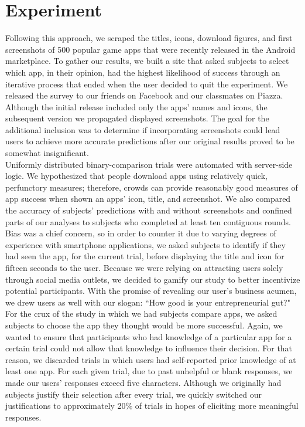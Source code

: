 \section{Experiment}


Following this approach, we scraped the titles, icons, download figures, and first screenshots of 500 popular game apps that were recently released in the Android marketplace.  To gather our results, we built a site that asked subjects to select which app, in their opinion, had the highest likelihood of success through an iterative process that ended when the user decided to quit the experiment.  We released the survey to our friends on Facebook and our classmates on Piazza. Although the initial release included only the apps' names and icons, the subsequent version we propagated displayed screenshots. The goal for the additional inclusion was to determine if incorporating screenshots could lead users to achieve more accurate predictions after our original results proved to be somewhat insignificant.  \\

Uniformly distributed binary-comparison trials were automated with server-side logic. We hypothesized that people download apps using relatively quick, perfunctory measures; therefore, crowds can provide reasonably good measures of app success when shown an apps' icon, title, and screenshot. We also compared the accuracy of subjects' predictions with and without screenshots and confined parts of our analyses to subjects who completed at least ten contiguous rounds. Bias was a chief concern, so in order to counter it due to varying degrees of experience with smartphone applications, we asked subjects to identify if they had seen the app, for the current trial, before displaying the title and icon for fifteen seconds to the user. Because we were relying on attracting users solely through social media outlets, we decided to gamify our study to better incentivize potential participants. With the promise of revealing our user's business acumen, we drew users as well with our slogan: “How good is your entrepreneurial gut?"\\

For the crux of the study in which we had subjects compare apps, we asked subjects to choose the app they thought would be more successful.  Again, we wanted to ensure that participants who had knowledge of a particular app for a certain trial could not allow that knowledge to influence their decision. For that reason, we discarded trials in which users had self-reported prior knowledge of at least one app. For each given trial, due to past unhelpful or blank responses, we made our users' responses exceed five characters. Although we originally had subjects justify their selection after every trial, we quickly switched our justifications to approximately 20\% of trials in hopes of eliciting more meaningful responses.\\
